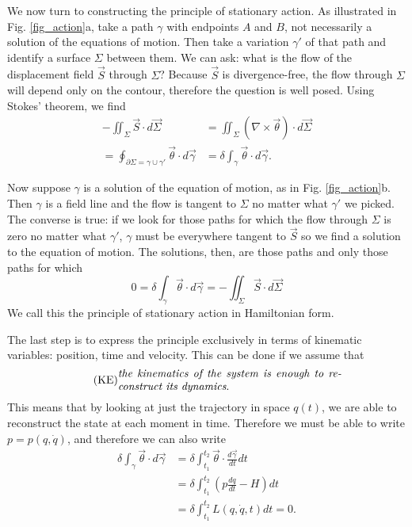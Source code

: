 \documentclass[10pt,twocolumn, nofootinbib]{revtex4-2}
\begin{document}
We now turn to constructing the principle of stationary action. As illustrated in Fig. \ref{fig_action}a, take a path $\gamma$ with endpoints $A$ and $B$, not necessarily a solution of the equations of motion. Then take a variation $\gamma'$ of that path and identify a surface $\Sigma$ between them. We can ask: what is the flow of the displacement field $\vec{S}$ through $\Sigma$? Because $\vec{S}$ is divergence-free, the flow through $\Sigma$ will depend only on the contour, therefore the question is well posed. Using Stokes' theorem, we find
\begin{equation}\label{sdof_action}
\begin{aligned}
	- \iint_{\Sigma} \vec{S} \cdot d\vec{\Sigma} &= \iint_{\Sigma} \left( \nabla \times \vec{\theta} \right) \cdot d\vec{\Sigma} \\
	=  \oint_{\partial \Sigma = \gamma \cup \gamma'} \vec{\theta}  \cdot d\vec{\gamma} 
	&= \delta \int_{\gamma} \vec{\theta} \cdot d\vec{\gamma}.
\end{aligned}
\end{equation}

Now suppose $\gamma$ is a solution of the equation of motion, as in Fig. \ref{fig_action}b. Then $\gamma$ is a field line and the flow is tangent to $\Sigma$ no matter what $\gamma'$ we picked. The converse is true: if we look for those paths for which the flow through $\Sigma$ is zero no matter what $\gamma'$, $\gamma$ must be everywhere tangent to $\vec{S}$ so we find a solution to the equation of motion. The solutions, then, are those paths and only those paths for which
\begin{equation}\label{sdof_stationary_action}
	0 =\delta \int_{\gamma} \vec{\theta} \cdot d\vec{\gamma} = - \iint_{\Sigma} \vec{S} \cdot d\vec{\Sigma} 
\end{equation}
We call this the principle of stationary action in Hamiltonian form.

The last step is to express the principle exclusively in terms of kinematic variables: position, time and velocity. This can be done if we assume that 
\begin{align}\label{assum_kineq}
	\tag*{(KE)}
	\parbox{2.8in}{\emph{the kinematics of the system is enough to reconstruct its dynamics}.}
\end{align}
This means that by looking at just the trajectory in space $q(t)$, we are able to reconstruct the state at each moment in time. Therefore we must be able to write $p=p(q,\dot{q})$, and therefore we can also write
\begin{equation}\label{sdof_Lagrangian}
	\begin{aligned}
		\delta \int_{\gamma} \vec{\theta} \cdot d\vec{\gamma} 
		&= \delta \int^{t_2}_{t_1} \vec{\theta} \cdot \frac{d\vec{\gamma}}{dt} dt \\  
		&= \delta \int^{t_2}_{t_1} \left(p \frac{dq}{dt} - H \right) dt \\
		&= \delta \int^{t_2}_{t_1}L(q, \dot{q}, t) dt = 0.
	\end{aligned}
\end{equation}
\end{document}
